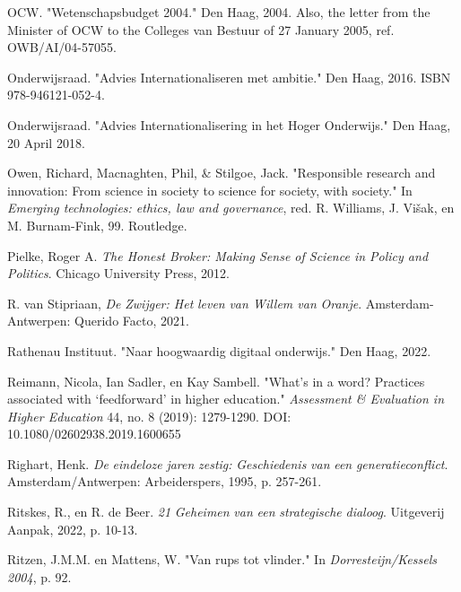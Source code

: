 \documentclass[smallauthor, chapterhaspagenum, nochapterinheader, pagenuminheader,  bigchapnum,medium2, tocpages,  garamond, titleinheader]{jote-book}
\begin{document}
\begin{references}
		OCW. "Wetenschapsbudget 2004." Den Haag, 2004. Also, the letter from the Minister of OCW to the Colleges van Bestuur of 27 January 2005, ref. OWB/AI/04-57055.



		Onderwijsraad. "Advies Internationaliseren met ambitie." Den Haag, 2016. ISBN 978-946121-052-4.



		Onderwijsraad. "Advies Internationalisering in het Hoger Onderwijs." Den Haag, 20 April 2018.



		Owen, Richard, Macnaghten, Phil, \& Stilgoe, Jack. "Responsible research and innovation: From science in society to science for society, with society." In \emph{Emerging technologies: ethics, law and governance}, red. R. Williams, J. Višak, en M. Burnam-Fink, 99. Routledge.



		Pielke, Roger A. \emph{The Honest Broker: Making Sense of Science in Policy and Politics}. Chicago University Press, 2012.



		R. van Stipriaan, \emph{De }\emph{Zwijger}\emph{: Het }\emph{leven}\emph{ van Willem van }\emph{Oranje}. Amsterdam-Antwerpen: Querido Facto, 2021.



		Rathenau Instituut. "Naar hoogwaardig digitaal onderwijs." Den Haag, 2022.



		Reimann, Nicola, Ian Sadler, en Kay Sambell. "What's in a word? Practices associated with ‘feedforward' in higher education." \emph{Assessment \& Evaluation in Higher Education} 44, no. 8 (2019): 1279-1290. DOI: 10.1080/02602938.2019.1600655



		Righart, Henk. \emph{De }\emph{eindeloze}\emph{ }\emph{jaren}\emph{ }\emph{zestig}\emph{: }\emph{Geschiedenis}\emph{ van }\emph{een}\emph{ }\emph{generatieconflict}. Amsterdam/Antwerpen: Arbeiderspers, 1995, p. 257-261.



		Ritskes, R., en R. de Beer. \emph{21 }\emph{Geheimen}\emph{ van }\emph{een}\emph{ }\emph{strategische}\emph{ }\emph{dialoog}. Uitgeverij Aanpak, 2022, p. 10-13.



		Ritzen, J.M.M. en Mattens, W. "Van rups tot vlinder." In \emph{Dorresteijn}\emph{/}\emph{Kessels}\emph{ 2004}, p. 92.




\end{references}
\end{document}
